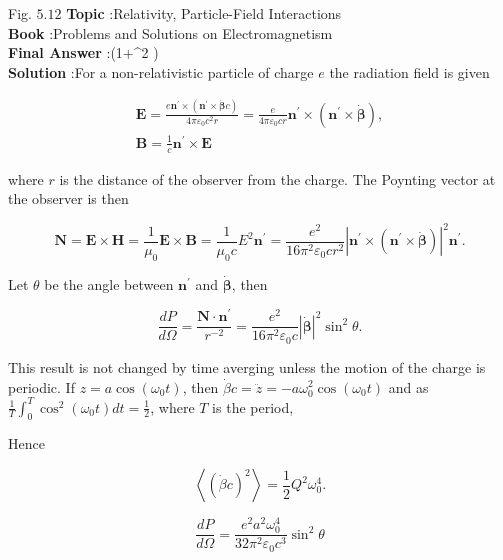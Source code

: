 \documentclass[10pt]{article}
\begin{document}
Fig. $5.12$
\textbf{Topic} :Relativity, Particle-Field Interactions\\
\textbf{Book} :Problems and Solutions on Electromagnetism\\
\textbf{Final Answer} :\left(1+\cos ^{2} \theta\right)\\


\textbf{Solution} :For a non-relativistic particle of charge $e$ the radiation field is given

$$
\begin{gathered}
\mathbf{E}=\frac{e \mathbf{n}^{\prime} \times\left(\mathbf{n}^{\prime} \times \dot{\boldsymbol{\beta}} c\right)}{4 \pi \varepsilon_{0} c^{2} r}=\frac{e}{4 \pi \varepsilon_{0} c r} \mathbf{n}^{\prime} \times\left(\mathbf{n}^{\prime} \times \dot{\boldsymbol{\beta}}\right), \\
\mathbf{B}=\frac{1}{c} \mathbf{n}^{\prime} \times \mathbf{E}
\end{gathered}
$$

where $r$ is the distance of the observer from the charge. The Poynting vector at the observer is then

$$
\mathbf{N}=\mathbf{E} \times \mathbf{H}=\frac{1}{\mu_{0}} \mathbf{E} \times \mathbf{B}=\frac{1}{\mu_{0} c} E^{2} \mathbf{n}^{\prime}=\frac{e^{2}}{16 \pi^{2} \varepsilon_{0} c r^{2}}\left|\mathbf{n}^{\prime} \times\left(\mathbf{n}^{\prime} \times \dot{\boldsymbol{\beta}}\right)\right|^{2} \mathbf{n}^{\prime} .
$$

Let $\theta$ be the angle between $\mathbf{n}^{\prime}$ and $\dot{\boldsymbol{\beta}}$, then

$$
\frac{d P}{d \Omega}=\frac{\mathbf{N} \cdot \mathbf{n}^{\prime}}{r^{-2}}=\frac{e^{2}}{16 \pi^{2} \varepsilon_{0} c}|\dot{\boldsymbol{\beta}}|^{2} \sin ^{2} \theta .
$$

This result is not changed by time averging unless the motion of the charge is periodic.
 If $z=a \cos \left(\omega_{0} t\right)$, then $\dot{\beta} c=\ddot{z}=-a \omega_{0}^{2} \cos \left(\omega_{0} t\right)$ and as $\frac{1}{T} \int_{0}^{T} \cos ^{2}\left(\omega_{0} t\right) d t=\frac{1}{2}$, where $T$ is the period,

Hence

$$
\left\langle(\dot{\beta} c)^{2}\right\rangle=\frac{1}{2} Q^{2} \omega_{0}^{4} .
$$

$$
\frac{d P}{d \Omega}=\frac{e^{2} a^{2} \omega_{0}^{4}}{32 \pi^{2} \varepsilon_{0} c^{3}} \sin ^{2} \theta
$$
\end{document}

